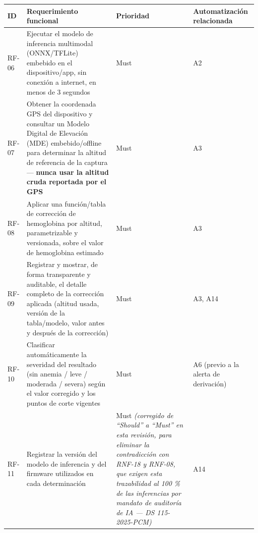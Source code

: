 \documentclass[11pt,a4paper]{article}
\begin{document}
{\small
\begin{longtable}[]{@{}
  >{\raggedright\arraybackslash}p{}
  >{\raggedright\arraybackslash}p{}
  >{\raggedright\arraybackslash}p{}
  >{\raggedright\arraybackslash}p{}@{}}
\toprule\noalign{}
\begin{minipage}[b]{\linewidth}\raggedright
ID
\end{minipage} & \begin{minipage}[b]{\linewidth}\raggedright
Requerimiento funcional
\end{minipage} & \begin{minipage}[b]{\linewidth}\raggedright
Prioridad
\end{minipage} & \begin{minipage}[b]{\linewidth}\raggedright
Automatización relacionada
\end{minipage} \\
\midrule\noalign{}
\endhead
\bottomrule\noalign{}
\endlastfoot
RF-06 & Ejecutar el modelo de inferencia multimodal (ONNX/TFLite) embebido en el dispositivo/app, sin conexión a internet, en menos de 3 segundos & Must & A2 \\
RF-07 & Obtener la coordenada GPS del dispositivo y consultar un Modelo Digital de Elevación (MDE) embebido/offline para determinar la altitud de referencia de la captura --- \textbf{nunca usar la altitud cruda reportada por el GPS} & Must & A3 \\
RF-08 & Aplicar una función/tabla de corrección de hemoglobina por altitud, parametrizable y versionada, sobre el valor de hemoglobina estimado & Must & A3 \\
RF-09 & Registrar y mostrar, de forma transparente y auditable, el detalle completo de la corrección aplicada (altitud usada, versión de la tabla/modelo, valor antes y después de la corrección) & Must & A3, A14 \\
RF-10 & Clasificar automáticamente la severidad del resultado (sin anemia / leve / moderada / severa) según el valor corregido y los puntos de corte vigentes & Must & A6 (previo a la alerta de derivación) \\
RF-11 & Registrar la versión del modelo de inferencia y del firmware utilizados en cada determinación & Must \emph{(corregido de ``Should'' a ``Must'' en esta revisión, para eliminar la contradicción con RNF-18 y RNF-08, que exigen esta trazabilidad al 100 \% de las inferencias por mandato de auditoría de IA --- DS 115-2025-PCM)} & A14 \\
\end{longtable}
}
\end{document}
